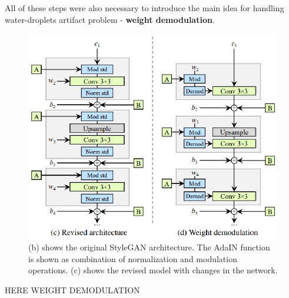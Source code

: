 \documentclass[12pt,a4paper,openany]{book}
\begin{document}
All of these steps were also necessary to introduce the main idea for handling water-droplets artifact problem - \textbf{weight demodulation}.

\begin{figure}[ht!]
    \centering
    \includegraphics[scale=1.3]{figs/weight-demodulation.eps}
    \caption{(b) shows the original StyleGAN architecture. The AdaIN function is shown as combination of normalization and modulation operations. (c) shows the revised model with changes in the network.}\label{Fig:STYLEGAN}
\end{figure}

HERE WEIGHT DEMODULATION





\end{document}
